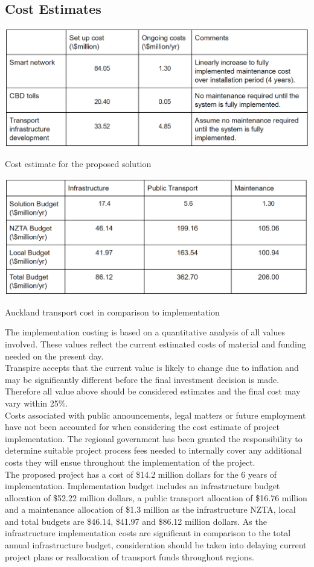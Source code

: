 \documentclass[twoside, a4paper, 11pt]{article}
\begin{document}
\subsection{Cost Estimates}
\begin{table}[H]
\centering
\includegraphics[width=\textwidth]{COSTONE.PNG}
\caption{Cost estimate for the proposed solution}
\label{costone}
\end{table}
\begin{table}[H]
\centering
\includegraphics[width=\textwidth]{COSTTWO.PNG}
\caption{Auckland transport cost in comparison to implementation}
\label{costtwo}
\end{table}
The implementation costing is based on a quantitative analysis of all values involved. These values reflect the current estimated costs of material and funding needed on the present day.
\\Transpire accepts that the current value is likely to change due to inflation and may be significantly different before the final investment decision is made. Therefore all value above should be considered estimates and the final cost may vary within 25\%.
\\Costs associated with public announcements, legal matters or future employment have not been accounted for when considering the cost estimate of project implementation. The regional government has been granted the responsibility to determine suitable project process fees needed to internally cover any additional costs they will ensue throughout the implementation of the project.
\\The proposed project has a cost of \$14.2 million dollars for the 6 years of implementation. Implementation budget includes an infrastructure budget allocation of \$52.22 million dollars, a public transport allocation of \$16.76 million and a maintenance allocation of \$1.3 million as the infrastructure NZTA, local and total budgets are \$46.14, \$41.97 and \$86.12 million dollars. As the infrastructure implementation costs are significant in comparison to the total annual infrastructure budget, consideration should be taken into delaying current project plans or reallocation of transport funds throughout regions.
\end{document}
